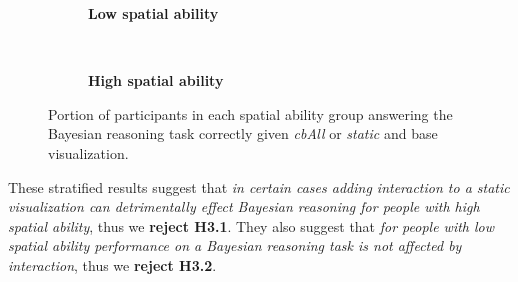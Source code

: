 \begin{figure}[h!]
    \begin{subfigure}[t]{0.52\columnwidth}
    \caption{\textbf{Low spatial ability}}
    \label{fig:exp2_corr_by_int_base_SA_low}
    \end{subfigure}%
    ~ 
    \begin{subfigure}[t]{0.48\columnwidth}
    \caption{\textbf{High spatial ability}}
    \label{fig:exp2_corr_by_int_base_SA_high}
    \end{subfigure}
    \caption{Portion of participants in each spatial ability group answering the Bayesian reasoning task correctly given \textit{cbAll} or \textit{static} and base visualization.}
    \label{fig:exp2_corr_by_int_base_SA}
\end{figure}     

These stratified results suggest that \textit{in certain cases adding interaction to a static visualization can detrimentally effect Bayesian reasoning for people with high spatial ability}, thus we \textbf{reject H3.1}. They also suggest that \textit{for people with low spatial ability performance on a Bayesian reasoning task is not affected by interaction}, thus we \textbf{reject H3.2}. 

